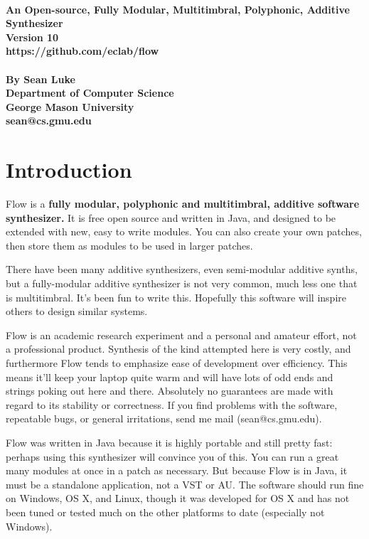 \documentclass{article}
\newcommand\name{Flow}
\begin{document}
\noindent {\Huge\bf {\name}}\\[0.5em]
{\large \bf An Open-source, Fully Modular, Multitimbral, Polyphonic, Additive Synthesizer\\[0.2em]
Version 10\\[0.2em]
https://github.com/eclab/flow\\\\[0.2em]
By Sean Luke\\[0.2em]
Department of Computer Science\\[0.25em]
George Mason University\\[0.2em]
sean@cs.gmu.edu}

\tableofcontents

\clearpage

\section{Introduction}

{\name} is a {\bf fully modular, polyphonic and multitimbral, additive software synthesizer.}  It is free open source and written in Java, and designed to be extended with new, easy to write modules.  You can also create your own patches, then store them as modules to be used in larger patches. 

There have been many additive synthesizers, even semi-modular additive synths, but a fully-modular additive synthesizer is not very common, much less one that is multitimbral.   It's been fun to write this.  Hopefully this software will inspire others to design similar systems.

{\name} is an academic research experiment and a personal and amateur effort, not a professional product.  Synthesis of the kind attempted here is very costly, and furthermore {\name} tends to emphasize ease of development over efficiency.  This means it'll keep your laptop quite warm and will have lots of odd ends and strings poking out here and there.  Absolutely no guarantees are made with regard to its stability or correctness.  If you find problems with the software, repeatable bugs, or general irritations, send me mail (sean@cs.gmu.edu).

{\name} was written in Java because it is highly portable and still pretty fast: perhaps using this synthesizer will convince you of this.  You can run a great many modules at once in a patch as necessary.  But because {\name} is in Java, it must be a standalone application, not a VST or AU.  The software should run fine on Windows, OS X, and Linux, though it was developed for OS X and has not been tuned or tested much on the other platforms to date (especially not Windows).
\end{document}
